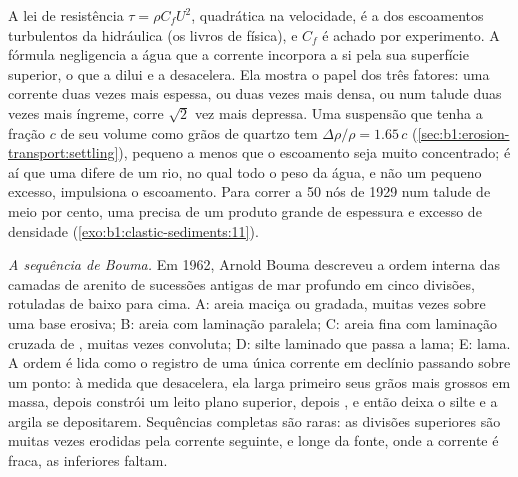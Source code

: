 A lei de resistência $\tau = \rho C_f U^2$, quadrática na velocidade, é a dos escoamentos turbulentos da hidráulica (os livros de física), e $C_f$ é achado por experimento. A fórmula negligencia a água que a corrente incorpora a si pela sua superfície superior, o que a dilui e a desacelera. Ela mostra o papel dos três fatores: uma corrente duas vezes mais espessa, ou duas vezes mais densa, ou num talude duas vezes mais íngreme, corre $\sqrt 2$ vez mais depressa. Uma suspensão que tenha a fração $c$ de seu volume como grãos de quartzo tem $\Delta\rho/\rho = 1.65\,c$ (\cref{sec:b1:erosion-transport:settling}), pequeno a menos que o escoamento seja muito concentrado; é aí que uma  difere de um rio, no qual todo o peso da água, e não um pequeno excesso, impulsiona o escoamento. Para correr a 50 nós de 1929 num talude de meio por cento, uma  precisa de um produto grande de espessura e excesso de densidade (\cref{exo:b1:clastic-sediments:11}).

\emph{A sequência de Bouma.} Em 1962, Arnold Bouma descreveu a ordem interna das camadas de arenito de sucessões antigas de mar profundo em cinco divisões, rotuladas de baixo para cima. A: areia maciça ou gradada, muitas vezes sobre uma base erosiva; B: areia com laminação paralela; C: areia fina com laminação cruzada de , muitas vezes convoluta; D: silte laminado que passa a lama; E: lama. A ordem é lida como o registro de uma única corrente em declínio passando sobre um ponto: à medida que desacelera, ela larga primeiro seus grãos mais grossos em massa, depois constrói um leito plano superior, depois , e então deixa o silte e a argila se depositarem. Sequências completas são raras: as divisões superiores são muitas vezes erodidas pela corrente seguinte, e longe da fonte, onde a corrente é fraca, as inferiores faltam.

